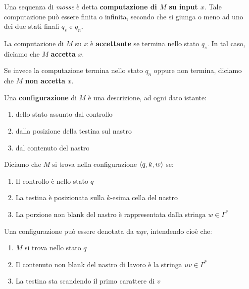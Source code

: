 \documentclass{lectures}
\begin{document}
\begin{multicols}{2}
    \begin{definition}[Computazione]
        Una sequenza di \textit{mosse} è detta \textbf{computazione di \(M\) su input \(x\)}. Tale computazione può essere finita o infinita, secondo che si giunga o meno ad uno dei due stati finali \(q_s\) e \(q_n\).
    \end{definition}
    \begin{definition}
        La computazione di \(M\) su \(x\) è \textbf{accettante} se termina nello stato \(q_s\). In tal caso, diciamo che \(M\) \textbf{accetta} \(x\).
        
        Se invece la computazione termina nello stato \(q_n\) oppure non termina, diciamo che \(M\) \textbf{non accetta} \(x\).
    \end{definition}
    \begin{definition}[Configurazione]
        Una \textbf{configurazione} di \(M\) è una descrizione, ad ogni dato istante:
        \begin{enumerate}
            \item dello stato assunto dal controllo
            \item dalla posizione della testina sul nastro
            \item dal contenuto del nastro
        \end{enumerate}
        Diciamo che \(M\) si trova nella configurazione \(\left\langle q,k,w\right\rangle\) se:
        \begin{enumerate}
            \item Il controllo è nello stato \(q\)
            \item La testina è posizionata sulla \(k\)-esima cella del nastro
            \item La porzione non blank del nastro è rappresentata dalla stringa \(w \in \Gamma^*\)
        \end{enumerate}
        Una configurazione può essere denotata da \(uqv\), intendendo cioè che:
        \begin{enumerate}
            \item \(M\) si trova nello stato \(q\)
            \item Il contenuto non blank del nastro di lavoro è la stringa \(uv \in \Gamma^*\)
            \item La testina sta scandendo il primo carattere di \(v\)
        \end{enumerate}
    \end{definition}

\end{multicols}
\end{document}
